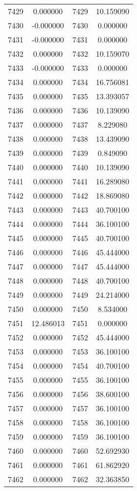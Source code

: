 \documentclass[12pt]{article}
\begin{document}
\begin{longtable}{@{}cccc@{}}
7429 & 0.000000 & 7429 & 10.159090 \\
7430 & -0.000000 & 7430 & 0.000000 \\
7431 & -0.000000 & 7431 & 0.000000 \\
7432 & 0.000000 & 7432 & 10.159070 \\
7433 & -0.000000 & 7433 & 0.000000 \\
7434 & 0.000000 & 7434 & 16.756081 \\
7435 & 0.000000 & 7435 & 13.393057 \\
7436 & 0.000000 & 7436 & 10.139090 \\
7437 & 0.000000 & 7437 & 8.229080 \\
7438 & 0.000000 & 7438 & 13.439090 \\
7439 & 0.000000 & 7439 & 0.849090 \\
7440 & 0.000000 & 7440 & 10.139090 \\
7441 & 0.000000 & 7441 & 16.289080 \\
7442 & 0.000000 & 7442 & 18.869080 \\
7443 & 0.000000 & 7443 & 40.700100 \\
7444 & 0.000000 & 7444 & 36.100100 \\
7445 & 0.000000 & 7445 & 40.700100 \\
7446 & 0.000000 & 7446 & 45.444000 \\
7447 & 0.000000 & 7447 & 45.444000 \\
7448 & 0.000000 & 7448 & 40.700100 \\
7449 & 0.000000 & 7449 & 24.214000 \\
7450 & 0.000000 & 7450 & 8.534000 \\
7451 & 12.486013 & 7451 & 0.000000 \\
7452 & 0.000000 & 7452 & 45.444000 \\
7453 & 0.000000 & 7453 & 36.100100 \\
7454 & 0.000000 & 7454 & 40.700100 \\
7455 & 0.000000 & 7455 & 36.100100 \\
7456 & 0.000000 & 7456 & 38.600100 \\
7457 & 0.000000 & 7457 & 36.100100 \\
7458 & 0.000000 & 7458 & 36.100100 \\
7459 & 0.000000 & 7459 & 36.100100 \\
7460 & 0.000000 & 7460 & 52.692930 \\
7461 & 0.000000 & 7461 & 61.862920 \\
7462 & 0.000000 & 7462 & 32.363850 \\

\end{longtable}
\end{document}
